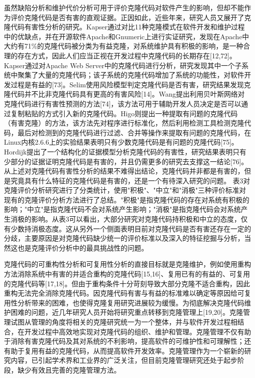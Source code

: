 虽然缺陷分析和维护代价分析可用于评价克隆代码对软件产生的影响，但却不能作为评价克隆代码是否有害的直观证据。正因如此，近些年来，研究人员又展开了克隆代码有害性分析的研究。Kapser通过对比11种克隆模式在软件开发和维护过程中的优缺点，并在开源软件Apache和Gnumeric上进行实证研究，发现在Apache中大约有71\%的克隆代码被分类为有益克隆，对系统维护具有积极的影响，是一种合理的存在方式，因此人们应当正视在开发过程中克隆代码的长期存在[12,72]。Kapser通过对Apache Web Server中的克隆代码进行分析，研究发现其中一个子系统中聚集了大量的克隆代码；该子系统的克隆代码增加了系统的功能性，对软件开发过程是有益的[73]。Selim使用风险模型判定克隆代码是否有害，研究结果发现克隆代码并不比非克隆代码具有更高的有害风险[14]。Wang提出利用贝叶斯网络对克隆代码进行有害性预测的方法[74]，该方法可用于辅助开发人员决定是否可以通过复制粘贴的方式引入新的克隆代码。Higo则提出一种提取有问题的克隆代码（有害克隆）的方法，该方法先对程序进行标准化，然后利用检测工具检测克隆代码，最后对检测到的克隆代码进行过滤、合并等操作来提取有问题的克隆代码，在Linux内核2.6.6上的实验结果表明只有少数克隆代码是有问题的克隆代码[75]。Hordijk提出了一个结构化的证据模型分析克隆代码的有害性，研究结果表明只有少部分的证据证明克隆代码是有害的，并且仍需更多的研究去支撑这一结论[76]。从上述对克隆代码有害性分析的结果不难得出结论，克隆代码并非都是有害的，但是究竟具有什么特征的克隆代码是有害的，还是一个有待深入研究的问题。
表3对克隆评价分析研究进行了分类统计，使用"积极"、"中立"和"消极"三种评价标准对现有的克隆评价分析方法进行了总结。"积极"是指克隆代码的存在对系统有积极的影响；"中立"是指克隆代码不会对系统产生影响；"消极"是指克隆代码会对系统产生消极的影响。从表3可以看出，大部分研究对克隆代码持积极和中立的态度，仅有少数持消极态度。这从另外一个侧面表明目前对克隆代码是否有害还存在一定的分歧，主要原因是对克隆代码缺少统一的评价标准以及深入的特征挖掘与分析，当然这也是克隆评价分析中的最具挑战性的问题。


克隆代码的可重构性分析和可复用性分析的直接目标就是克隆维护，例如使用重构方法消除系统中有害的并适合重构的克隆代码[15,16]、复用已有的有益的、可复用的克隆代码等[17,18]。但由于重构条件十分苛刻导致大部分克隆不适合重构，因此重构无法完全消除克隆代码。因克隆代码有害与有益的标准难以确定等原因给可复用性分析带来的困难，也使得克隆复用研究进展较为缓慢。为彻底解决克隆代码维护困难的问题，近几年研究人员开始将研究重点转移到克隆管理上[19,20]。克隆管理试图从管理的角度将相关的克隆研究统一为一个整体，并与软件开发过程相结合，在开发过程中高效地实现对克隆代码的组织、维护和管理。克隆管理不仅有助于消除有害克隆代码及其对系统的不利影响，提高软件的可维护性和可理解性；还有助于复用有益的克隆代码，从而提高软件开发效率。克隆管理作为一个崭新的研究内容，已引起学术界和工业界的广泛关注，但目前克隆管理研究还处于起步阶段，缺少有效且完善的克隆管理方法。

